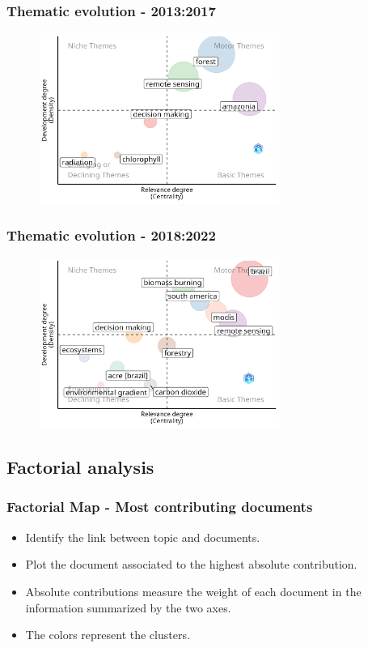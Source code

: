 \documentclass[aspectratio=169]{beamer}
\begin{document}
\begin{frame}
	\frametitle{Thematic evolution - 2013:2017}
    \begin{figure}
        \centering
        \includegraphics[width=0.7\textwidth]{figures/thematic_evolution_3.png}
    \end{figure}
\end{frame}

\begin{frame}
	\frametitle{Thematic evolution - 2018:2022}
    \begin{figure}
        \centering
        \includegraphics[width=0.7\textwidth]{figures/thematic_evolution_4.png}
    \end{figure}
\end{frame}


\subsection{Factorial analysis}


\begin{frame}
	\frametitle{Factorial Map - Most contributing documents}
	\begin{itemize}
		\item Identify the link between topic and documents.
		\item Plot the document associated to the highest absolute contribution.
		\item Absolute contributions measure the weight of each document in
		      the information summarized by the two axes.
		\item The colors represent the clusters.
	\end{itemize}
\end{frame}
\end{document}
